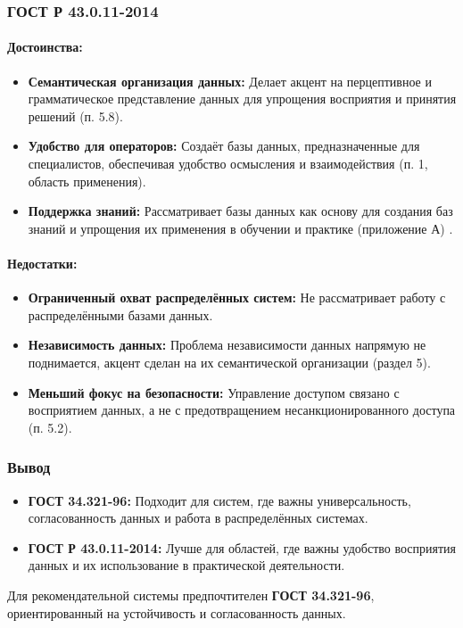 \subsubsection*{ГОСТ Р 43.0.11-2014}

\paragraph{Достоинства:}
\begin{itemize}
    \item \textbf{Семантическая организация данных:} Делает акцент на перцептивное и грамматическое представление данных для упрощения восприятия и принятия решений (п. 5.8).
    \item \textbf{Удобство для операторов:} Создаёт базы данных, предназначенные для специалистов, обеспечивая удобство осмысления и взаимодействия (п. 1, область применения).
    \item \textbf{Поддержка знаний:} Рассматривает базы данных как основу для создания баз знаний и упрощения их применения в обучении и практике (приложение А) .
\end{itemize}

\paragraph{Недостатки:}
\begin{itemize}
    \item \textbf{Ограниченный охват распределённых систем:} Не рассматривает работу с распределёнными базами данных.
    \item \textbf{Независимость данных:} Проблема независимости данных напрямую не поднимается, акцент сделан на их семантической организации (раздел 5).
    \item \textbf{Меньший фокус на безопасности:} Управление доступом связано с восприятием данных, а не с предотвращением несанкционированного доступа (п. 5.2).
\end{itemize}

\subsubsection*{Вывод}
\begin{itemize}
    \item \textbf{ГОСТ 34.321-96:} Подходит для систем, где важны универсальность, согласованность данных и работа в распределённых системах.
    \item \textbf{ГОСТ Р 43.0.11-2014:} Лучше для областей, где важны удобство восприятия данных и их использование в практической деятельности.
\end{itemize}
Для рекомендательной системы предпочтителен \textbf{ГОСТ 34.321-96}, ориентированный на устойчивость и согласованность данных.
